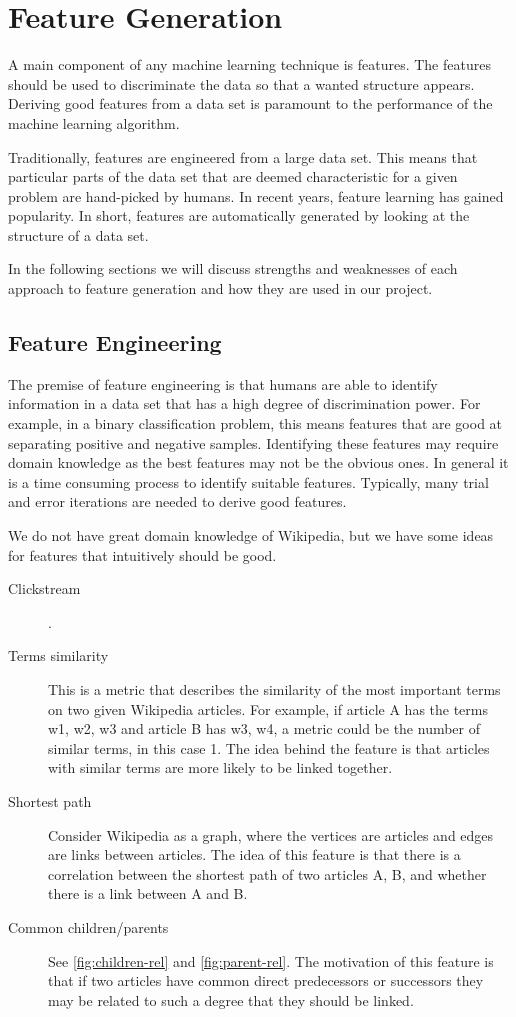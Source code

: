 \section{Feature Generation}\label{sec:feature_generation}
A main component of any machine learning technique is features. The features should be used to discriminate the data so that a wanted structure appears. Deriving good features from a data set is paramount to the performance of the machine learning algorithm.

Traditionally, features are engineered from a large data set. This means that particular parts of the data set that are deemed characteristic for a given problem are hand-picked by humans. In recent years, feature learning has gained popularity. In short, features are automatically generated by looking at the structure of a data set.

In the following sections we will discuss strengths and weaknesses of each approach to feature generation and how they are used in our project.

\subsection{Feature Engineering}
The premise of feature engineering is that humans are able to identify information in a data set that has a high degree of discrimination power. For example, in a binary classification problem, this means features that are good at separating positive and negative samples. Identifying these features may require domain knowledge as the best features may not be the obvious ones. In general it is a time consuming process to identify suitable features. Typically, many trial and error iterations are needed to derive good features.

We do not have great domain knowledge of Wikipedia, but we have some ideas for features that intuitively should be good.

\begin{description}
    \item[Clickstream] .
    \item[Terms similarity] This is a metric that describes the similarity of the most important terms on two given Wikipedia articles. For example, if article A has the terms w1, w2, w3 and article B has w3, w4, a metric could be the number of similar terms, in this case 1. The idea behind the feature is that articles with similar terms are more likely to be linked together.
    \item[Shortest path] Consider Wikipedia as a graph, where the vertices are articles and edges are links between articles. The idea of this feature is that there is a correlation between the shortest path of two articles A, B, and whether there is a link between A and B. 
    \item[Common children/parents] See \cref{fig:children-rel} and \cref{fig:parent-rel}. The motivation of this feature is that if two articles have common direct predecessors or successors they may be related to such a degree that they should be linked. 
\end{description}


